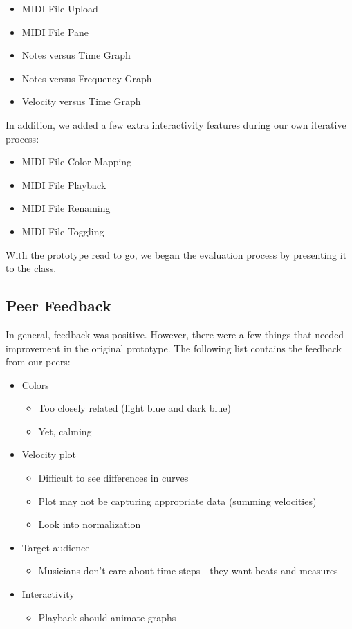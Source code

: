 \documentclass[journal]{vgtc}                %
\begin{document}
\begin{itemize}
  \item MIDI File Upload
  \item MIDI File Pane
  \item Notes versus Time Graph
  \item Notes versus Frequency Graph
  \item Velocity versus Time Graph
\end{itemize}

In addition, we added a few extra interactivity features during our own
iterative process:

\begin{itemize}
  \item MIDI File Color Mapping
  \item MIDI File Playback
  \item MIDI File Renaming
  \item MIDI File Toggling
\end{itemize}

With the prototype read to go, we began the evaluation process by presenting
it to the class.

\subsection{Peer Feedback}

In general, feedback was positive. However, there were a few things
that needed improvement in the original prototype. The following
list contains the feedback from our peers:

\begin{itemize}
  \item Colors
  \begin{itemize}
    \item Too closely related (light blue and dark blue)
    \item Yet, calming
  \end{itemize}
  \item Velocity plot
  \begin{itemize}
    \item Difficult to see differences in curves
    \item Plot may not be capturing appropriate data (summing velocities)
    \item Look into normalization
  \end{itemize}
  \item Target audience
  \begin{itemize}
    \item Musicians don't care about time steps - they want beats and measures
  \end{itemize}
  \item Interactivity
  \begin{itemize}
    \item Playback should animate graphs
  \end{itemize}
\end{itemize}
\end{document}
